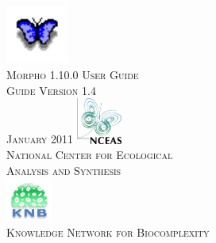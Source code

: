 \documentclass[11pt]{article}
\begin{document}
  \pagestyle{empty}

  \begin{titlepage}
    \begin{center}
    \includegraphics[width=2cm]{images/logo-morpho.png}\\[0.5cm]
    \textsc{\LARGE Morpho 1.10.0 User Guide}\\[1cm]
    \textsc{Guide Version 1.4}\\
    \textsc{January 2011}
    \vfill
    \includegraphics[width=1.5cm]{images/logo-nceas.jpg}\\[0.5cm]
    \textsc{National Center for Ecological\\Analysis and Synthesis}\\[1cm]
    \includegraphics[width=1.5cm]{images/logo-knb.jpg}\\[0.2cm]
    \textsc{Knowledge Network for Biocomplexity}
    \end{center}
  \end{titlepage}
  \pagebreak

  \tableofcontents
  \pagebreak

  
    \setcounter{figure}{0} 
  
    \setcounter{figure}{0} 
  
    \setcounter{figure}{0} 
  
    \setcounter{figure}{0} 
  
    \setcounter{figure}{0} 
  
    \setcounter{figure}{0} 
  
    \setcounter{figure}{0} 
  
    \setcounter{figure}{0} 
  
    \setcounter{figure}{0} 
  
    \setcounter{figure}{0} 
  
    \setcounter{figure}{0} 
  
    \setcounter{figure}{0} 
  

\end{document}
